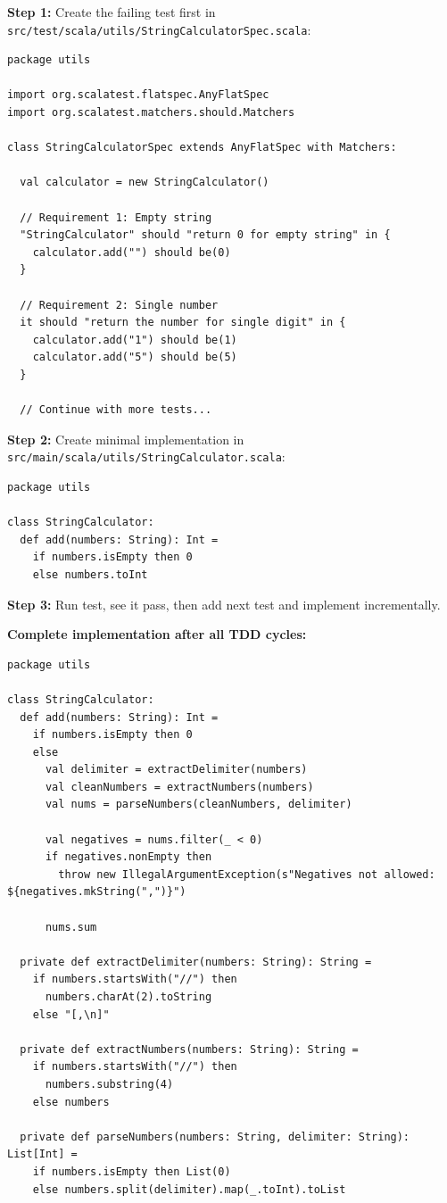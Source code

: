 \documentclass[12pt,a4paper]{article}
\begin{document}
\textbf{Step 1:} Create the failing test first in \texttt{src/test/scala/utils/StringCalculatorSpec.scala}:

\begin{lstlisting}
package utils

import org.scalatest.flatspec.AnyFlatSpec
import org.scalatest.matchers.should.Matchers

class StringCalculatorSpec extends AnyFlatSpec with Matchers:
  
  val calculator = new StringCalculator()
  
  // Requirement 1: Empty string
  "StringCalculator" should "return 0 for empty string" in {
    calculator.add("") should be(0)
  }
  
  // Requirement 2: Single number
  it should "return the number for single digit" in {
    calculator.add("1") should be(1)
    calculator.add("5") should be(5)
  }
  
  // Continue with more tests...
\end{lstlisting}

\textbf{Step 2:} Create minimal implementation in \texttt{src/main/scala/utils/StringCalculator.scala}:

\begin{lstlisting}
package utils

class StringCalculator:
  def add(numbers: String): Int = 
    if numbers.isEmpty then 0
    else numbers.toInt
\end{lstlisting}

\textbf{Step 3:} Run test, see it pass, then add next test and implement incrementally.

\textbf{Complete implementation after all TDD cycles:}

\begin{lstlisting}
package utils

class StringCalculator:
  def add(numbers: String): Int = 
    if numbers.isEmpty then 0
    else 
      val delimiter = extractDelimiter(numbers)
      val cleanNumbers = extractNumbers(numbers)
      val nums = parseNumbers(cleanNumbers, delimiter)
      
      val negatives = nums.filter(_ < 0)
      if negatives.nonEmpty then
        throw new IllegalArgumentException(s"Negatives not allowed: ${negatives.mkString(",")}")
      
      nums.sum
  
  private def extractDelimiter(numbers: String): String = 
    if numbers.startsWith("//") then
      numbers.charAt(2).toString
    else "[,\n]"
  
  private def extractNumbers(numbers: String): String = 
    if numbers.startsWith("//") then
      numbers.substring(4)
    else numbers
  
  private def parseNumbers(numbers: String, delimiter: String): List[Int] = 
    if numbers.isEmpty then List(0)
    else numbers.split(delimiter).map(_.toInt).toList
\end{lstlisting}
\end{document}
